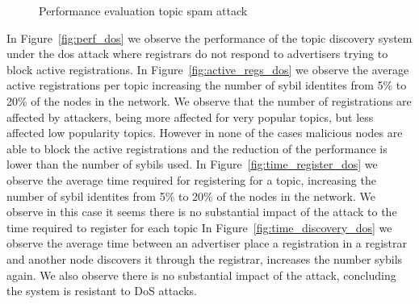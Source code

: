 
\begin{figure}[!h]
\centering
{} 
\hspace{-0.16cm}
\hspace{-0.15in}
\caption{Performance evaluation topic spam attack} 
\label{fig:perf_spam}
\vspace{-0.15in}
\end{figure}   

In Figure~\ref{fig:perf_dos} we observe the performance of the topic discovery system under the dos attack where registrars do not respond to advertisers trying to block active registrations.
In Figure~\ref{fig:active_regs_dos} we observe the average active registrations per topic increasing the number of sybil identites from 5\% to 20\% of the nodes in the network.
We observe that the number of registrations are affected by attackers,  being more affected for very popular topics,  but less affected low popularity topics.  However in none of the cases malicious nodes are able to block the active registrations and the reduction of the performance is lower than the number of sybils used.
In Figure~\ref{fig:time_register_dos} we observe the average time required for registering for a topic,  increasing the number of sybil identites from 5\% to 20\% of the nodes in the network.
We observe in this case it seems there is no substantial impact of the attack to the time required to register for each topic
In Figure~\ref{fig:time_discovery_dos} we observe the average time between an advertiser place a registration in a registrar and another node discovers it through the registrar,  increases the number sybils again.
We also observe there is no substantial impact of the attack, concluding the system is resistant to DoS attacks.


